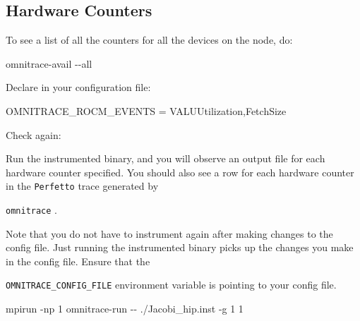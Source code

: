 \documentclass[
]{article}
\let\oldtexttt\texttt
\renewcommand{\texttt}[1]{
  \colorbox{Light}{\oldtexttt{#1}}
}
\newenvironment{Shaded}{}{}
\newcommand{\ExtensionTok}[1]{#1}
\newcommand{\FunctionTok}[1]{\textcolor[rgb]{0.02,0.16,0.49}{#1}}
\newcommand{\NormalTok}[1]{#1}
\newcommand{\VariableTok}[1]{\textcolor[rgb]{0.10,0.09,0.49}{#1}}
\begin{document}
\hypertarget{hardware-counters}{%
\subsection{Hardware Counters}\label{hardware-counters}}

To see a list of all the counters for all the devices on the node, do:

\begin{Shaded}
\begin{Highlighting}[]
\ExtensionTok{omnitrace{-}avail}\NormalTok{ {-}{-}all}
\end{Highlighting}
\end{Shaded}

Declare in your configuration file:

\begin{Shaded}
\begin{Highlighting}[]
\ExtensionTok{OMNITRACE\_ROCM\_EVENTS}\NormalTok{ = VALUUtilization,FetchSize}
\end{Highlighting}
\end{Shaded}

Check again:

\begin{Shaded}
\end{Shaded}

Run the instrumented binary, and you will observe an output file for
each hardware counter specified. You should also see a row for each
hardware counter in the \texttt{Perfetto} trace generated by
\texttt{omnitrace}.

Note that you do not have to instrument again after making changes to
the config file. Just running the instrumented binary picks up the
changes you make in the config file. Ensure that the
\texttt{OMNITRACE\_CONFIG\_FILE} environment variable is pointing to
your config file.

\begin{Shaded}
\begin{Highlighting}[]
\ExtensionTok{mpirun}\NormalTok{ {-}np 1 omnitrace{-}run {-}{-} ./Jacobi\_hip.inst {-}g 1 1}
\end{Highlighting}
\end{Shaded}
\end{document}
